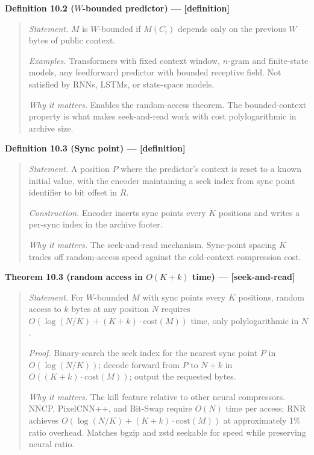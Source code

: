\documentclass[
]{article}
\begin{document}
\textbf{Definition 10.2 ($W$-bounded predictor) --- {[}definition{]}}

\begin{quote}
\emph{Statement.} $M$ is $W$-bounded if $M(C_i)$ depends only on the
previous $W$ bytes of public context.

\emph{Examples.} Transformers with fixed context window, $n$-gram and
finite-state models, any feedforward predictor with bounded receptive
field. Not satisfied by RNNs, LSTMs, or state-space models.

\emph{Why it matters.} Enables the random-access theorem. The
bounded-context property is what makes seek-and-read work with cost
polylogarithmic in archive size.
\end{quote}

\textbf{Definition 10.3 (Sync point) --- {[}definition{]}}

\begin{quote}
\emph{Statement.} A position $P$ where the predictor's context is
reset to a known initial value, with the encoder maintaining a seek
index from sync point identifier to bit offset in $R$.

\emph{Construction.} Encoder inserts sync points every $K$
positions and writes a per-sync index in the archive footer.

\emph{Why it matters.} The seek-and-read mechanism. Sync-point
spacing $K$ trades off random-access speed against the cold-context
compression cost.
\end{quote}

\textbf{Theorem 10.3 (random access in $O(K + k)$ time) ---
{[}seek-and-read{]}}

\begin{quote}
\emph{Statement.} For $W$-bounded $M$ with sync points every $K$
positions, random access to $k$ bytes at any position $N$ requires
$O(\log(N/K) + (K + k) \cdot \mathrm{cost}(M))$ time, only
polylogarithmic in $N$.

\emph{Proof.} Binary-search the seek index for the nearest sync
point $P$ in $O(\log(N/K))$; decode forward from $P$ to $N + k$ in
$O((K + k) \cdot \mathrm{cost}(M))$; output the requested bytes.

\emph{Why it matters.} The kill feature relative to other neural
compressors. NNCP, PixelCNN++, and Bit-Swap require $O(N)$ time per
access; RNR achieves $O(\log(N/K) + (K + k) \cdot \mathrm{cost}(M))$
at approximately 1\% ratio overhead.
Matches bgzip and zstd seekable for speed while preserving neural
ratio.
\end{quote}
\end{document}
